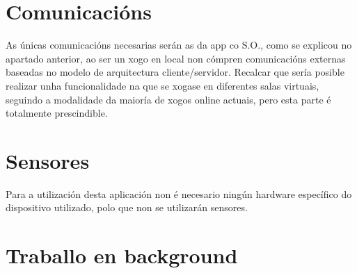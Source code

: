 \section {Comunicacións}
As únicas comunicacións necesarias serán as da app co S.O., como se explicou no apartado anterior, ao ser un xogo en local non cómpren comunicacións externas baseadas no modelo de arquitectura cliente/servidor. Recalcar que sería posible realizar unha funcionalidade na que se xogase en diferentes salas virtuais, seguindo a modalidade da maioría de xogos online actuais, pero esta parte é totalmente prescindible.

\section {Sensores}
Para a utilización desta aplicación non é necesario ningún hardware específico do dispositivo utilizado, polo que non se utilizarán sensores. 

\section {Traballo en background} 

\let\cleardoublepage=\clearpage